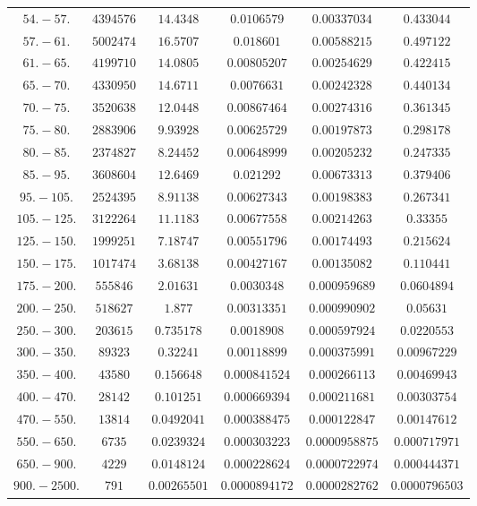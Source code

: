 \documentclass[11pt]{article}
\begin{document}
\begin{table}[htbp]
{\begin{tabular}{cccccc}
        $54.-57.$ & $4394576$ & $14.4348$ & $0.0106579$ & $0.00337034$ & $0.433044$ \\
        $57.-61.$ & $5002474$ & $16.5707$ & $0.018601$ & $0.00588215$ & $0.497122$ \\
        $61.-65.$ & $4199710$ & $14.0805$ & $0.00805207$ & $0.00254629$ & $0.422415$ \\
        $65.-70.$ & $4330950$ & $14.6711$ & $0.0076631$ & $0.00242328$ & $0.440134$ \\
        $70.-75.$ & $3520638$ & $12.0448$ & $0.00867464$ & $0.00274316$ & $0.361345$ \\
        $75.-80.$ & $2883906$ & $9.93928$ & $0.00625729$ & $0.00197873$ & $0.298178$ \\
        $80.-85.$ & $2374827$ & $8.24452$ & $0.00648999$ & $0.00205232$ & $0.247335$ \\
        $85.-95.$ & $3608604$ & $12.6469$ & $0.021292$ & $0.00673313$ & $0.379406$ \\
        $95.-105.$ & $2524395$ & $8.91138$ & $0.00627343$ & $0.00198383$ & $0.267341$ \\
        $105.-125.$ & $3122264$ & $11.1183$ & $0.00677558$ & $0.00214263$ & $0.33355$ \\
        $125.-150.$ & $1999251$ & $7.18747$ & $0.00551796$ & $0.00174493$ & $0.215624$ \\
        $150.-175.$ & $1017474$ & $3.68138$ & $0.00427167$ & $0.00135082$ & $0.110441$ \\
        $175.-200.$ & $555846$ & $2.01631$ & $0.0030348$ & $0.000959689$ & $0.0604894$ \\
        $200.-250.$ & $518627$ & $1.877$ & $0.00313351$ & $0.000990902$ & $0.05631$ \\
        $250.-300.$ & $203615$ & $0.735178$ & $0.0018908$ & $0.000597924$ & $0.0220553$ \\
        $300.-350.$ & $89323$ & $0.32241$ & $0.00118899$ & $0.000375991$ & $0.00967229$ \\
        $350.-400.$ & $43580$ & $0.156648$ & $0.000841524$ & $0.000266113$ & $0.00469943$ \\
        $400.-470.$ & $28142$ & $0.101251$ & $0.000669394$ & $0.000211681$ & $0.00303754$ \\
        $470.-550.$ & $13814$ & $0.0492041$ & $0.000388475$ & $0.000122847$ & $0.00147612$ \\
        $550.-650.$ & $6735$ & $0.0239324$ & $0.000303223$ & $0.0000958875$ & $0.000717971$ \\
        $650.-900.$ & $4229$ & $0.0148124$ & $0.000228624$ & $0.0000722974$ & $0.000444371$ \\
        $900.-2500.$ & $791$ & $0.00265501$ & $0.0000894172$ & $0.0000282762$ & $0.0000796503$ \\
	\bottomrule
	\end{tabular}
}
\end{table}
\end{document}
